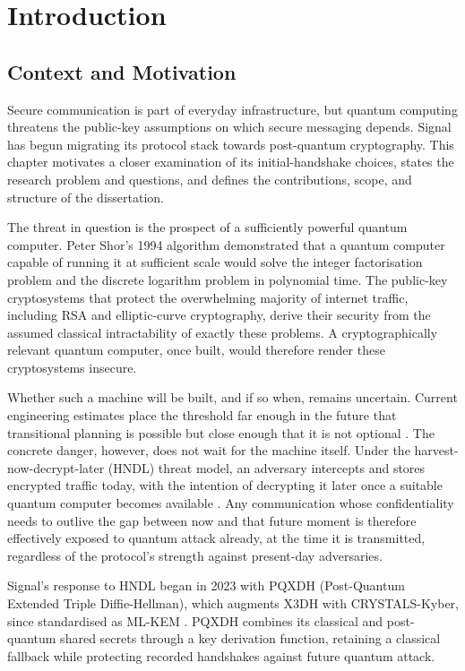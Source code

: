 \section{Introduction}
\label{sec:introduction}

\subsection{Context and Motivation}
\label{subsec:context-motivation}

Secure communication is part of everyday infrastructure, but quantum computing threatens the public-key assumptions on which secure messaging depends. Signal has begun migrating its protocol stack towards post-quantum cryptography. This chapter motivates a closer examination of its initial-handshake choices, states the research problem and questions, and defines the contributions, scope, and structure of the dissertation.

The threat in question is the prospect of a sufficiently powerful quantum computer. Peter Shor's 1994 algorithm \cite{shor_algorithms_1994} demonstrated that a quantum computer capable of running it at sufficient scale would solve the integer factorisation problem and the discrete logarithm problem in polynomial time. The public-key cryptosystems that protect the overwhelming majority of internet traffic, including RSA and elliptic-curve cryptography, derive their security from the assumed classical intractability of exactly these problems. A cryptographically relevant quantum computer, once built, would therefore render these cryptosystems insecure.

Whether such a machine will be built, and if so when, remains uncertain. Current engineering estimates place the threshold far enough in the future that transitional planning is possible but close enough that it is not optional \cite{mosca_cybersecurity_2018}. The concrete danger, however, does not wait for the machine itself. Under the harvest-now-decrypt-later (HNDL) threat model, an adversary intercepts and stores encrypted traffic today, with the intention of decrypting it later once a suitable quantum computer becomes available \cite{mosca_cybersecurity_2018}. Any communication whose confidentiality needs to outlive the gap between now and that future moment is therefore effectively exposed to quantum attack already, at the time it is transmitted, regardless of the protocol's strength against present-day adversaries.

Signal's response to HNDL began in 2023 with PQXDH (Post-Quantum Extended Triple Diffie-Hellman), which augments X3DH with CRYSTALS-Kyber, since standardised as ML-KEM \cite{kret_pqxdh_nodate,kret_quantum_nodate}. PQXDH combines its classical and post-quantum shared secrets through a key derivation function, retaining a classical fallback while protecting recorded handshakes against future quantum attack.

